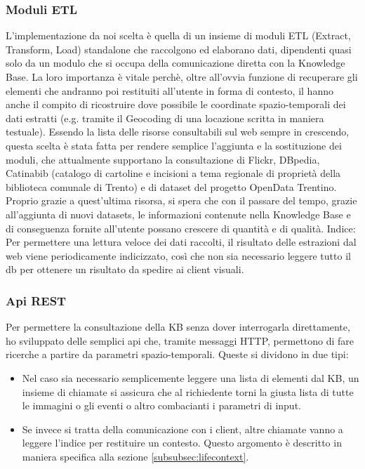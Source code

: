 \documentclass[sigproc-sp.tex]{subfiles}
\begin{document}
\subsubsection{Moduli ETL}
L’implementazione da noi scelta è quella di un insieme di moduli ETL (Extract, Transform, Load) standalone che raccolgono ed elaborano dati, dipendenti quasi solo da un modulo che si occupa della comunicazione diretta con la Knowledge Base. La loro importanza è vitale perchè, oltre all’ovvia funzione di recuperare gli elementi che andranno poi restituiti all’utente in forma di contesto, il hanno anche il compito di ricostruire dove possibile le coordinate spazio-temporali dei dati estratti (e.g. tramite il Geocoding di una locazione scritta in maniera testuale). Essendo la lista delle risorse consultabili sul web sempre in crescendo, questa scelta è stata fatta per rendere semplice l’aggiunta e la sostituzione dei moduli, che attualmente supportano la consultazione di Flickr, DBpedia, Catinabib (catalogo di cartoline e incisioni a tema regionale di proprietà della biblioteca comunale di Trento) e di dataset del progetto OpenData Trentino. Proprio grazie a quest’ultima risorsa, si spera che con il passare del tempo, grazie all’aggiunta di nuovi datasets, le informazioni contenute nella Knowledge Base e di conseguenza fornite all’utente possano crescere di quantità e di qualità. 
Indice: Per permettere una lettura veloce dei dati raccolti, il risultato delle estrazioni dal web viene periodicamente indicizzato, così che non sia necessario leggere tutto il db per ottenere un risultato da spedire ai client visuali.

\subsubsection{Api REST}
Per permettere la consultazione della KB senza dover interrogarla direttamente, ho sviluppato delle semplici api che, tramite messaggi HTTP, permettono di fare ricerche a partire da parametri spazio-temporali. Queste si dividono in due tipi:
\begin{itemize}
\item Nel caso sia necessario semplicemente leggere una lista di elementi dal KB, un insieme di chiamate si assicura che al richiedente torni la giusta lista di tutte le immagini o gli eventi o altro combacianti i parametri di input.
\item Se invece si tratta della comunicazione con i client, altre chiamate vanno a leggere l’indice per restituire un contesto. Questo argomento è descritto in maniera specifica alla sezione \ref{subsubsec:lifecontext}.
\end{itemize}
\end{document}
